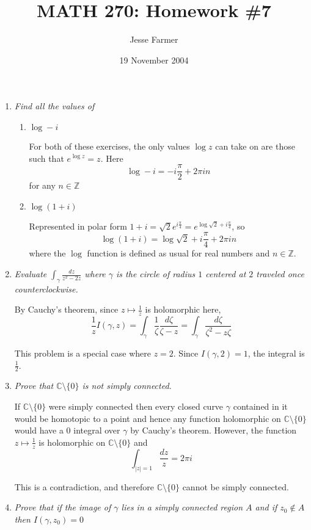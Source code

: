 \documentclass[letterpaper, 11pt]{article}
\title{MATH 270: Homework \#7}
\author{Jesse Farmer}
\date{19 November 2004}
\newcommand{\Z}{\mathbb{Z}}
\newcommand{\C}{\mathbb{C}}
\begin{document}
\maketitle
\begin{enumerate}

\item \emph{Find all the values of}
\begin{enumerate}
\item \emph{$\log -i $}

For both of these exercises, the only values $\log z $ can take on are those such that $e^{\log z} = z$. Here $$\log -i = -i\frac{\pi}{2} + 2\pi i n$$ for any $n \in \Z$
\item \emph{$\log \left(1+i\right)$}

Represented in polar form $1 + i = \sqrt{2}e^{i\frac{\pi}{4}} = e^{\log \sqrt{2} + i\frac{\pi}{4}}$, so $$\log \left(1+i\right) = \log \sqrt{2} + i\frac{\pi}{4} + 2 \pi i n$$ where the $\log$ function is defined as usual for real numbers and $n \in \Z$.
\end{enumerate}

\item \emph{Evaluate $\int_{\gamma} \frac{dz}{z^2-2z}$ where $\gamma$ is the circle of radius $1$ centered at $2$ traveled once counterclockwise.}

By Cauchy's theorem, since $z \mapsto \frac{1}{z}$ is holomorphic here,
\[
\frac{1}{z}I(\gamma,z) = \int_{\gamma} \frac{1}{\zeta}\frac{d\zeta}{\zeta - z} = \int_{\gamma} \frac{d\zeta}{\zeta^2 - z\zeta}
\]

This problem is a special case where $z = 2$.  Since $I(\gamma, 2) = 1$, the integral is $\frac{1}{2}$.

\item \emph{Prove that $\C \setminus \{0\}$ is not simply connected.}

If $\C \setminus \{0\}$ were simply connected then every closed curve $\gamma$ contained in it would be homotopic to a point and hence any function holomorphic on $\C \setminus \{0\}$ would have a $0$ integral over $\gamma$ by Cauchy's theorem.  However, the function $z \mapsto \frac{1}{z}$ is holomorphic on $\C \setminus \{0\}$ and
\[
\int_{|z|=1} \frac{dz}{z} = 2\pi i
\]

This is a contradiction, and therefore $\C \setminus \{0\}$ cannot be simply connected.

\item \emph{Prove that if the image of $\gamma$ lies in a simply connected region $A$ and if $z_0 \notin A$ then $I(\gamma, z_0) = 0$}


\end{enumerate}
\end{document}
